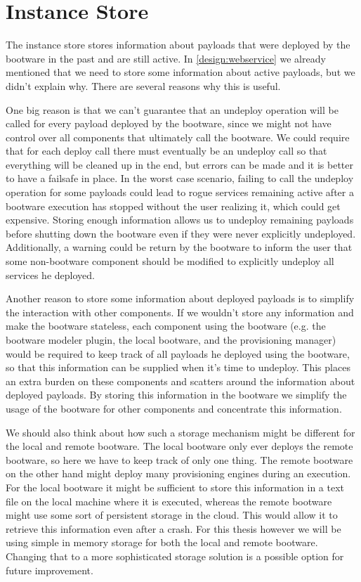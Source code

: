 \section{Instance Store}
\label{design:instancestore}

The instance store stores information about payloads that were deployed by the bootware in the past and are still active.
In \autoref{design:webservice} we already mentioned that we need to store some information about active payloads, but we didn't explain why.
There are several reasons why this is useful.

One big reason is that we can't guarantee that an undeploy operation will be called for every payload deployed by the bootware, since we might not have control over all components that ultimately call the bootware.
We could require that for each deploy call there must eventually be an undeploy call so that everything will be cleaned up in the end, but errors can be made and it is better to have a failsafe in place.
In the worst case scenario, failing to call the undeploy operation for some payloads could lead to rogue services remaining active after a bootware execution has stopped without the user realizing it, which could get expensive.
Storing enough information allows us to undeploy remaining payloads before shutting down the bootware even if they were never explicitly undeployed.
Additionally, a warning could be return by the bootware to inform the user that some non-bootware component should be modified to explicitly undeploy all services he deployed.

Another reason to store some information about deployed payloads is to simplify the interaction with other components.
If we wouldn't store any information and make the bootware stateless, each component using the bootware (e.g. the bootware modeler plugin, the local bootware, and the provisioning manager) would be required to keep track of all payloads he deployed using the bootware, so that this information can be supplied when it's time to undeploy.
This places an extra burden on these components and scatters around the information about deployed payloads.
By storing this information in the bootware we simplify the usage of the bootware for other components and concentrate this information.

We should also think about how such a storage mechanism might be different for the local and remote bootware.
The local bootware only ever deploys the remote bootware, so here we have to keep track of only one thing.
The remote bootware on the other hand might deploy many provisioning engines during an execution.
For the local bootware it might be sufficient to store this information in a text file on the local machine where it is executed, whereas the remote bootware might use some sort of persistent storage in the cloud.
This would allow it to retrieve this information even after a crash.
For this thesis however we will be using simple in memory storage for both the local and remote bootware.
Changing that to a more sophisticated storage solution is a possible option for future improvement.

